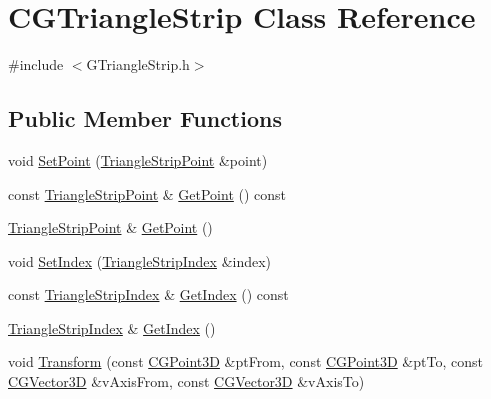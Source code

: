 \hypertarget{class_c_g_triangle_strip}{}\section{C\+G\+Triangle\+Strip Class Reference}
\label{class_c_g_triangle_strip}


{\ttfamily \#include $<$G\+Triangle\+Strip.\+h$>$}

\subsection*{Public Member Functions}
\begin{DoxyCompactItemize}
\item 
void \hyperlink{class_c_g_triangle_strip_a7208bb54f1b3f6844d3c389a84daab9b}{Set\+Point} (\hyperlink{_g_triangle_strip_8h_a469e63f2aaedd82d5b176dc74c4beaba}{Triangle\+Strip\+Point} \&point)
\item 
const \hyperlink{_g_triangle_strip_8h_a469e63f2aaedd82d5b176dc74c4beaba}{Triangle\+Strip\+Point} \& \hyperlink{class_c_g_triangle_strip_ae354e957b1fea59bc42628665898c051}{Get\+Point} () const 
\item 
\hyperlink{_g_triangle_strip_8h_a469e63f2aaedd82d5b176dc74c4beaba}{Triangle\+Strip\+Point} \& \hyperlink{class_c_g_triangle_strip_aae1c99bdb1506f32cf17d83e544d9eb7}{Get\+Point} ()
\item 
void \hyperlink{class_c_g_triangle_strip_aa6bb61b34d53983a944684d33d2f8251}{Set\+Index} (\hyperlink{_g_triangle_strip_8h_adde3d27be4f88fe45d14165ff8c084f8}{Triangle\+Strip\+Index} \&index)
\item 
const \hyperlink{_g_triangle_strip_8h_adde3d27be4f88fe45d14165ff8c084f8}{Triangle\+Strip\+Index} \& \hyperlink{class_c_g_triangle_strip_aaa5cee9ca0df2218cd0856641854c4a8}{Get\+Index} () const 
\item 
\hyperlink{_g_triangle_strip_8h_adde3d27be4f88fe45d14165ff8c084f8}{Triangle\+Strip\+Index} \& \hyperlink{class_c_g_triangle_strip_ac8d455db16e52b96767fc998e40a761e}{Get\+Index} ()
\item 
void \hyperlink{class_c_g_triangle_strip_a9ed849047d23ebe2b51a6c0974401372}{Transform} (const \hyperlink{class_c_g_point3_d}{C\+G\+Point3\+D} \&pt\+From, const \hyperlink{class_c_g_point3_d}{C\+G\+Point3\+D} \&pt\+To, const \hyperlink{_g_point3_d_8h_aa7e73d39f4c991acb5a13c84b498366d}{C\+G\+Vector3\+D} \&v\+Axis\+From, const \hyperlink{_g_point3_d_8h_aa7e73d39f4c991acb5a13c84b498366d}{C\+G\+Vector3\+D} \&v\+Axis\+To)

\end{DoxyCompactItemize}
